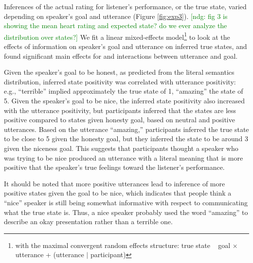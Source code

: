 \documentclass[10pt,letterpaper]{article}
\newcommand{\ndg}[1]{\textcolor{Green}{[ndg: #1]}}
\begin{document}
Inferences of the actual rating for listener's performance, or the true state, varied depending on speaker's goal and utterance (Figure \ref{fig:exp3}).
\ndg{fig 3 is showing the mean heart rating and expected state? do we ever analyze the distribution over states?}
We fit a linear mixed-effects model\footnote{with the maximal convergent random effects structure: true state ~ goal $\times$ utterance + (utterance $|$ participant)} to look at the effects of information on speaker's goal and utterance on inferred true states, and found significant main effects for and interactions between utterance and goal. 

Given the speaker's goal to be honest, as predicted from the literal semantics distribution, inferred state positivity was correlated with utterance positivity: e.g., ``terrible'' implied approximately the true state of 1, ``amazing'' the state of 5. %
Given the speaker's goal to be nice, the inferred state positivity also increased with the utterance positivity, but participants inferred that the states are less positive compared to states given honesty goal, based on neutral and positive utterances. Based on the utterance ``amazing,'' participants inferred the true state to be close to 5 given the honesty goal, but they inferred the state to be around 3 given the niceness goal. This suggests that participants thought a speaker who was trying to be nice produced an utterance  with a literal meaning that is more positive that the speaker's true feelings toward the listener's performance.

It should be noted that more positive utterances lead to inference of more positive states given the goal to be nice, which indicates that people think a ``nice'' speaker is still being somewhat informative with respect to communicating what the true state is. Thus, a nice speaker probably used the word ``amazing'' to describe an okay presentation rather than a terrible one.
\end{document}
